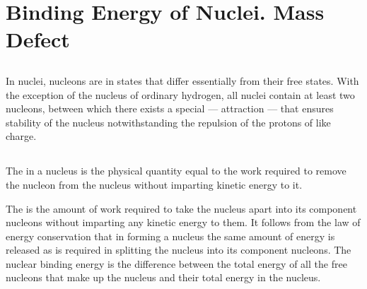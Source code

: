 \section{Binding Energy of Nuclei. Mass Defect}
\label{sec-42.2} 

\subsection{}\label{42.2.1} 

In nuclei, nucleons are in states that differ essentially
from their free states. With the exception of the nucleus of ordinary hydrogen, all nuclei contain at least two nucleons, between which there exists a special  --- attraction --- that ensures stability of the nucleus notwithstanding the repulsion of the protons of like charge.


\subsection{}\label{42.2.2}

The  in a nucleus is the physical quantity equal to the work required to remove the nucleon from the nucleus without imparting kinetic energy to it. 

The  is the amount of work required to take the nucleus apart into its component nucleons without imparting any kinetic energy to them. It follows from the law of energy conservation that in forming a nucleus the same amount of energy is released as is required in splitting the nucleus into its component nucleons. The nuclear binding energy is the difference between the total energy of all the free nucleons that make up the nucleus and their total energy in the nucleus.

\subsection{}\label{42.2.3}

